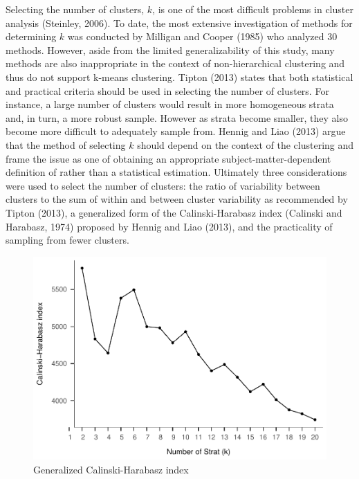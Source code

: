 \documentclass[man,floatsintext]{apa6}
\begin{document}
Selecting the number of clusters, \(k\), is one of the most difficult problems in cluster analysis (Steinley, 2006). To date, the most extensive investigation of methods for determining \(k\) was conducted by Milligan and Cooper (1985) who analyzed 30 methods. However, aside from the limited generalizability of this study, many methods are also inappropriate in the context of non-hierarchical clustering and thus do not support k-means clustering. Tipton (2013) states that both statistical and practical criteria should be used in selecting the number of clusters. For instance, a large number of clusters would result in more homogeneous strata and, in turn, a more robust sample. However as strata become smaller, they also become more difficult to adequately sample from. Hennig and Liao (2013) argue that the method of selecting \(k\) should depend on the context of the clustering and frame the issue as one of obtaining an appropriate subject-matter-dependent definition of rather than a statistical estimation. Ultimately three considerations were used to select the number of clusters: the ratio of variability between clusters to the sum of within and between cluster variability as recommended by Tipton (2013), a generalized form of the Calinski-Harabasz index (Calinski and Harabasz, 1974) proposed by Hennig and Liao (2013), and the practicality of sampling from fewer clusters.

\begin{figure}
\centering
\includegraphics{GenSamp_Paper_files/figure-latex/fig-ch-1.pdf}
\caption{\label{fig:fig-ch}Generalized Calinski-Harabasz index}
\end{figure}
\end{document}
